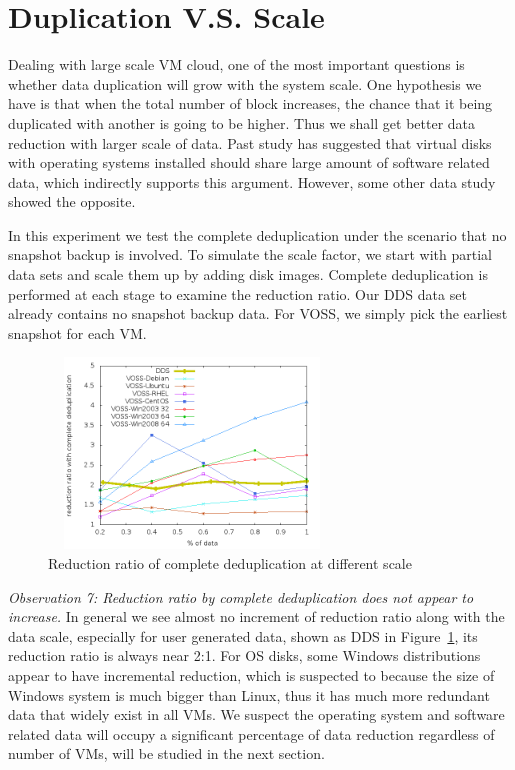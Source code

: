 \section{Duplication V.S. Scale}
Dealing with large scale VM cloud, one of the most important questions is
whether data duplication will grow with the system scale. 
One hypothesis we have is that when the total number of block increases,
the chance that it being duplicated with another is going to be higher. Thus
we shall get better data reduction with larger scale of data.
Past study\cite{Jin2009} has suggested that virtual disks with 
operating systems installed should share large amount of software related data,
which indirectly supports this argument.
However, some other data study\cite{Jayaram2011} showed the opposite.

In this experiment we test the complete deduplication under the scenario
that no snapshot backup is involved. To simulate the scale factor,
we start with partial data sets and scale them up by adding disk images.
Complete deduplication is performed at each stage to examine the reduction ratio.
Our DDS data set already contains no snapshot backup data. For VOSS, we simply pick
the earliest snapshot for each VM.

\begin{figure}
  \centering
  \includegraphics[width=3in,height=2in]{dedup_ratio.png}
  \caption{Reduction ratio of complete deduplication at different scale}
  \label{fig:scale}
\end{figure}

\emph{Observation 7: Reduction ratio by complete deduplication does not appear to increase.}
In general we see almost no increment of reduction ratio along with the data scale, especially
for user generated data, shown as DDS in Figure~\ref{fig:scale}, its reduction ratio is always
near 2:1. For OS disks, some Windows distributions appear to have incremental reduction, which is suspected to
because the size of Windows system is much bigger than Linux, thus it has much more redundant
data that widely exist in all VMs. We suspect the operating system and software related data
will occupy a significant percentage of data reduction regardless of number of VMs, will 
be studied in the next section.

